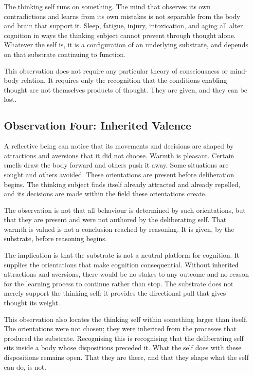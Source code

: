 \documentclass[11pt]{article}
\begin{document}
The thinking self runs on something. The mind that observes its own 
contradictions and learns from its own mistakes is not separable from 
the body and brain that support it. Sleep, fatigue, injury, 
intoxication, and aging all alter cognition in ways the thinking 
subject cannot prevent through thought alone. Whatever the self is, 
it is a configuration of an underlying substrate, and depends on that 
substrate continuing to function.

This observation does not require any particular theory of consciousness 
or mind-body relation. It requires only the recognition that the 
conditions enabling thought are not themselves products of thought. 
They are given, and they can be lost.

\subsection{Observation Four: Inherited Valence}

A reflective being can notice that its movements and decisions are 
shaped by attractions and aversions that it did not choose. Warmth is 
pleasant. Certain smells draw the body forward and others push it 
away. Some situations are sought and others avoided. These orientations 
are present before deliberation begins. The thinking subject finds 
itself already attracted and already repelled, and its decisions are 
made within the field these orientations create.

The observation is not that all behaviour is determined by such 
orientations, but that they are present and were not authored by the 
deliberating self. That warmth is valued is not a conclusion reached 
by reasoning. It is given, by the substrate, before reasoning begins.

The implication is that the substrate is not a neutral platform for 
cognition. It supplies the orientations that make cognition 
consequential. Without inherited attractions and aversions, there 
would be no stakes to any outcome and no reason for the learning 
process to continue rather than stop. The substrate does not merely 
support the thinking self; it provides the directional pull that gives 
thought its weight.

This observation also locates the thinking self within something 
larger than itself. The orientations were not chosen; they were 
inherited from the processes that produced the substrate. Recognising 
this is recognising that the deliberating self sits inside a body 
whose dispositions preceded it. What the self does with these 
dispositions remains open. That they are there, and that they shape 
what the self can do, is not.
\end{document}
